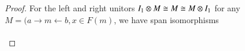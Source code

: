 \documentclass[reqno]{amsart}
\begin{document}
\begin{proof}
\begin{comment}
(A) edge node[above]{$(i_1+i_2)+i_3$} (B)
(C) edge node[above]{$(o_1+o_2)+o_3$} (B);
\end{tikzpicture}
\]
where $(x_1+x_2)+x_3 \maps 1 \to F((m_1+m_2)+m_3)$ is the composite
\[  1 \xrightarrow{(x_1 \times x_2) \times x_3} (F(m_1) \times F(m_2)) \times F(m_3) \xrightarrow{\phi_{m_1,m_2} \times 1} F(m_1+m_2) \times F(m_3) \xrightarrow{\phi_{m_1+m_2,m_3}} F((m_1+m_2)+m_3).\]
The other parenthesization $M_1 \otimes (M_2 \otimes M_3)$ is given by:
\[
\begin{tikzpicture}[scale=1.5]
\node (A) at (0,0) {$a_1+(a_2+a_3)$};
\node (B) at (2.5,0) {$m_1+(m_2+m_3)$};
\node (C) at (5,0) {$b_1+(b_2+b_3)$};
\node (D) at (2.5,-0.5) {$x_1+(x_2+x_3) \in F(m_1+(m_2+m_3))$};
\path[->,font=\scriptsize,>=angle 90]
(A) edge node[above]{$i_1+(i_2+i_3)$} (B)
(C) edge node[above]{$o_1+(o_2+o_3)$} (B);
\end{tikzpicture}
\]
where $x_1+(x_2+x_3) \maps 1 \to F(m_1+(m_2+m_3))$ is the composite
\[  1 \xrightarrow{x_1 \times (x_2 \times x_3)} F(m_1) \times (F(m_2) \times F(m_3)) \xrightarrow{1 \times \phi_{m_2,m_3}} F(m_1) \times F(m_2+m_3) \xrightarrow{\phi_{m_1,m_2+m_3}} F(m_1+(m_2+m_3)).\]
Denoting the associator of $(\A,+)$ by $\alpha$, the associator of $F\lCsp_1$ is then a map of cospans in $\A$ from $(M_1 \otimes M_2) \otimes M_3$ to $M_1 \otimes (M_2 \otimes M_3)$ given by:
\[
\begin{tikzpicture}[scale=1.5]
\node (A) at (0,0.5) {$(a_1+a_2)+a_3$};
\node (A') at (0,-0.5) {$a_1+(a_2+a_3)$};
\node (B) at (2.25,0.5) {$(m_1+m_2)+m_3$};
\node (C) at (4.5,0.5) {$(b_1+b_2)+b_3$};
\node (C') at (4.5,-0.5) {$b_1+(b_2+b_3)$};
\node (D) at (2.25,-0.5) {$m_1+(m_2+m_3)$};
\node (E) at (7,0.5) {$(x_1+x_2)+x_3 \in F((m_1+m_2)+m_3)$};
\node (F) at (7,-0.5) {$x_1+(x_2+x_3) \in F(m_1+(m_2+m_3))$};
\path[->,font=\scriptsize,>=angle 90]
(A) edge node[above]{$(i_1+i_2)+i_3$} (B)
(C) edge node[above]{$(o_1+o_2)+o_3$} (B)
(A) edge node[left]{$\alpha$} (A')
(C) edge node[right]{$\alpha$} (C')
(A') edge node [above]{$i_1+(i_2+i_3)$} (D)
(C') edge node [above]{$o_1+(o_2+o_3)$} (D)
(B) edge node [left] {$\alpha$} (D);
\end{tikzpicture}
\]
together with the decoration isomorphism $\tau_\alpha \maps F(\alpha)((x_1+x_2)+x_3) \to x_1+(x_2+x_3)$.
\end{comment}
For the left and right unitors $I_1\otimes M\cong M\cong M\otimes I_1$ for any $M=(a\to m\leftarrow b,x\in F(m)$, we have span isomorphisms
\begin{displaymath}
 \begin{tikzcd}[column sep=.3in]

\end{tikzcd}
\end{displaymath}
\end{proof}
\end{document}
